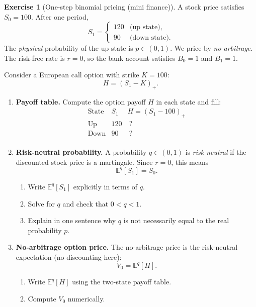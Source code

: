 \documentclass[11pt]{article}
\newcommand{\1}{\mathbf{1}}
\theoremstyle{definition}
\newtheorem{exercise}{Exercise}[section]
\begin{document}
\begin{exercise}[One-step binomial pricing (mini finance)]
A stock price satisfies $S_0=100$. After one period,
$$
S_1=
\begin{cases}
120 & \text{(up state)},\\
90  & \text{(down state)}.
\end{cases}
$$
The \emph{physical} probability of the up state is $p\in(0,1)$.
We price by \emph{no-arbitrage}. The risk-free rate is $r=0$,
so the bank account satisfies $B_0=1$ and $B_1=1$.

Consider a European call option with strike $K=100$:
$$
H=(S_1-K)_+.
$$

\begin{enumerate}[label=\textbf{(\alph*)}, itemsep=0.35em]

  \item \textbf{Payoff table.}
  Compute the option payoff $H$ in each state and fill:
  $$
  \begin{array}{c|c|c}
  \text{State} & S_1 & H=(S_1-100)_+\\ \hline
  \text{Up} & 120 & \ ? \ \\
  \text{Down} & 90 & \ ? \ \\
  \end{array}
  $$

  \item \textbf{Risk-neutral probability.}
  A probability $q\in(0,1)$ is \emph{risk-neutral} if the discounted stock price
  is a martingale. Since $r=0$, this means
  $$
  \mathbb E^{q}[S_1]=S_0.
  $$
  \begin{enumerate}[label=\textbf{(\roman*)}, itemsep=0.2em]
    \item Write $\mathbb E^{q}[S_1]$ explicitly in terms of $q$.
    \item Solve for $q$ and check that $0<q<1$.
    \item Explain in one sentence why $q$ is not necessarily equal to the real probability $p$.
  \end{enumerate}

  \item \textbf{No-arbitrage option price.}
  The no-arbitrage price is the risk-neutral expectation (no discounting here):
  $$
  V_0=\mathbb E^{q}[H].
  $$
  \begin{enumerate}[label=\textbf{(\roman*)}, itemsep=0.2em]
    \item Write $\mathbb E^{q}[H]$ using the two-state payoff table.
    \item Compute $V_0$ numerically.
  \end{enumerate}


\end{enumerate}
\end{exercise}
\end{document}
